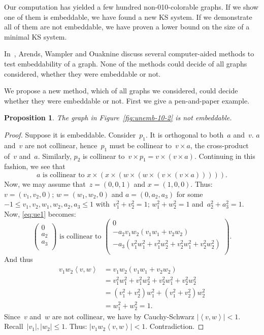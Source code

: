 \documentclass[a4paper]{article}
\newcounter{main}
\newtheorem{prop}[main]{Proposition}
\theoremstyle{definition}
\theoremstyle{remark}
\begin{document}
Our computation has yielded a few hundred non-010-colorable graphs.
If we show one of them is embeddable, we have found a new KS system.
If we demonstrate all of them are not embeddable, we have
proven a lower bound on the size of a minimal KS system.

In~\cite{aow11}, Arends, Wampler and Ouaknine discuss several
computer-aided methods
to test embeddability of a graph.  None of the methods could decide
of all graphs considered, whether they were embeddable or not.

We propose a new method,
which of all graphs we considered,
could decide
whether they were embeddable or not.
First we give a pen-and-paper example.
\begin{prop}\label{prop:unemb-10-2}
The graph in Figure~\ref{fig:unemb-10-2}
is not embeddable.
\end{prop}
\begin{proof}
Suppose it is embeddable.
Consider~$p_1$.
It is orthogonal to both~$a$ and~$v$.
$a$ and~$v$ are not collinear,
hence~$p_1$ must be collinear to~$v \times a$,
the cross-product of~$v$ and~$a$.
Similarly, $p_2$ is collinear to~$v \times p_1 = v \times (v \times a)$.
Continuing in this fashion,
we see that
\begin{equation}\label{eq:ue1}
    a \text{ is collinear to }
    x \times (x \times( w \times (w\times (v \times (v \times a))))).
\end{equation}
Now, we may assume that~$z=(0,0,1)$ and $x=(1,0,0)$.
Thus: $v=(v_1,v_2,0)$;
$w = (w_1,w_2,0)$
and $a = (0, a_2,a_3)$ for some~$-1 \leq v_1,v_2,w_1,w_2,a_2,a_3 \leq 1$
with~$v_1^2+v_2^2 = 1$; $w_1^2+w_2^2=1$ and~$a_2^2 + a_3^2=1$.
Now, \eqref{eq:ue1} becomes:
\begin{equation*}
\begin{pmatrix}
0\\
a_2\\
a_3\\
\end{pmatrix}
\text{ is collinear to }
\begin{pmatrix}
0\\
-a_2 v_1w_2 (v_1w_1 + v_2w_2) \\
-a_3 (v_1^2 w_1^2 + v_1^2 w_2^2 + v_2^2w_1^2 + v_2^2w_2^2)\\
\end{pmatrix}.
\end{equation*}
And thus
\begin{align*}
v_1w_2 \left<v,w\right> & =
v_1w_2 (v_1w_1 + v_2w_2) \\
& = v_1^2 w_1^2 + v_1^2 w_2^2 + v_2^2w_1^2 + v_2^2w_2^2 \\
& = (v_1^2 + v_2^2)w_1^2 + (v_1^2 + v_2^2)w_2^2 \\
& = w_1^2 + w_2^2 = 1.
\end{align*}
Since~$v$ and~$w$ are not collinear,
we have by Cauchy-Schwarz $|\left<v,w\right>| < 1$.
Recall~$|v_1|, |w_2| \leq 1$.
Thus: $|v_1w_2\left<v,w\right>| < 1$.
Contradiction.
\end{proof}
\end{document}

